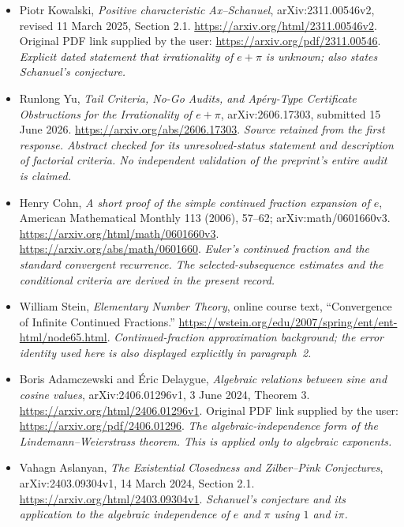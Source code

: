 \documentclass[11pt]{article}
\begin{document}
\begin{itemize}
 \raggedright
 \item[S1] Piotr Kowalski, \emph{Positive characteristic Ax--Schanuel},
 arXiv:2311.00546v2, revised 11 March 2025, Section 2.1.
 \url{https://arxiv.org/html/2311.00546v2}.
 Original PDF link supplied by the user:
 \url{https://arxiv.org/pdf/2311.00546}.
 \textit{Explicit dated statement that irrationality of $e+\pi$ is unknown;
 also states Schanuel's conjecture.}

 \item[S2] Runlong Yu, \emph{Tail Criteria, No-Go Audits, and Ap\'ery-Type
 Certificate Obstructions for the Irrationality of $e+\pi$},
 arXiv:2606.17303, submitted 15 June 2026.
 \url{https://arxiv.org/abs/2606.17303}.
 \textit{Source retained from the first response. Abstract checked for its
 unresolved-status statement and description of factorial criteria.
 No independent validation of the preprint's entire audit is claimed.}

 \item[E1] Henry Cohn, \emph{A short proof of the simple continued fraction
 expansion of $e$}, American Mathematical Monthly 113 (2006), 57--62;
 arXiv:math/0601660v3.
 \url{https://arxiv.org/html/math/0601660v3}.
 \url{https://arxiv.org/abs/math/0601660}.
 \textit{Euler's continued fraction and the standard convergent recurrence.
 The selected-subsequence estimates and the conditional criteria are
 derived in the present record.}

 \item[E2] William Stein, \emph{Elementary Number Theory}, online course
 text, ``Convergence of Infinite Continued Fractions.''
 \url{https://wstein.org/edu/2007/spring/ent/ent-html/node65.html}.
 \textit{Continued-fraction approximation background; the error identity
 used here is also displayed explicitly in paragraph~2.}

 \item[E3] Boris Adamczewski and \'Eric Delaygue,
 \emph{Algebraic relations between sine and cosine values},
 arXiv:2406.01296v1, 3 June 2024, Theorem 3.
 \url{https://arxiv.org/html/2406.01296v1}.
 Original PDF link supplied by the user:
 \url{https://arxiv.org/pdf/2406.01296}.
 \textit{The algebraic-independence form of the Lindemann--Weierstrass
 theorem. This is applied only to algebraic exponents.}

 \item[E4] Vahagn Aslanyan, \emph{The Existential Closedness and Zilber--Pink
 Conjectures}, arXiv:2403.09304v1, 14 March 2024, Section 2.1.
 \url{https://arxiv.org/html/2403.09304v1}.
 \textit{Schanuel's conjecture and its application to the algebraic
 independence of $e$ and $\pi$ using $1$ and $i\pi$.}


\end{itemize}
\end{document}
